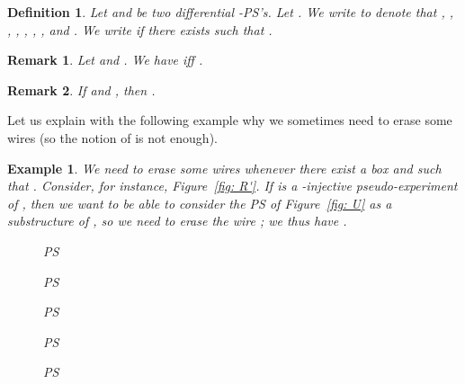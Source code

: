 \documentclass{article}
\theoremstyle{plain}
\newtheorem{definition}{Definition}
\newtheorem{example}{Example}
\newtheorem{fact}[theorem]{Fact}
\newtheorem{rem}{Remark}
\newcommand{\scalefactbis}{0.4}
\newcommand{\pictbis}[1]{\scalebox{\scalefactbis}{}}
\newcommand{\scalefactter}{0.33}
\newcommand{\pictter}[1]{\scalebox{\scalefactter}{}}
\newcommand{\scalefactnine}{0.3}
\newcommand{\pictnine}[1]{\scalebox{\scalefactnine}{}}
\newcommand{\scalefactten}{0.45}
\newcommand{\pictten}[1]{\scalebox{\scalefactten}{}}
\begin{document}
\begin{definition}\label{defin: substructure}
Let  and  be two differential -PS's. Let . We write  to denote that , , , , , , 
,  and . We write  if there exists  such that .  
\end{definition}

\begin{rem}
Let  and . We have  iff .
\end{rem}


\begin{rem}
If  and , then .
\end{rem}

Let us explain with the following example why we sometimes need to erase some wires (so the notion of  is not enough).  

\begin{example}
We need to erase some wires whenever there exist a box  and  such that . Consider, for instance, Figure~\ref{fig: R'}. If  is a -injective pseudo-experiment of , then we want to be able to consider the PS  of Figure~\ref{fig: U} as a substructure of , so we need to erase the wire ; we thus have .
\begin{figure}
\begin{minipage}{0.25\textwidth}
\centering
\pictbis{simple_net_bis}
\caption{PS }\label{fig: no reconstruction of the experiment}
\end{minipage}
\centering
\begin{minipage}{0.17\textwidth}
\centering
\pictnine{S}
\caption{PS }
\label{fig: R'}
\end{minipage}\hfill
\begin{minipage}{0.16\textwidth}
\centering
\pictnine{U}
\caption{PS }
\label{fig: U}
\end{minipage}
\begin{minipage}{0.21\textwidth}
\centering
\pictter{T_e_bis_1}
\caption{PS }
\label{fig: T(e')[1]}
\end{minipage}
\begin{minipage}{0.14\textwidth}
\centering
\pictten{T}
\caption{PS }
\label{fig: T}
\end{minipage}\hfill
\end{figure}
\end{example}

\begin{comment}
\begin{fact}\label{fact: adequate}
Let  be a differential -PS. Let  such that
\begin{enumerate} 
\item 
\item and .
\end{enumerate}
Then there exists a substructure  of  such that  and .
\end{fact}


If the set  satisfies the conditions of the previous fact, then we denote by  the unique substructure  of  such that  and . \end{comment}
\end{document}
